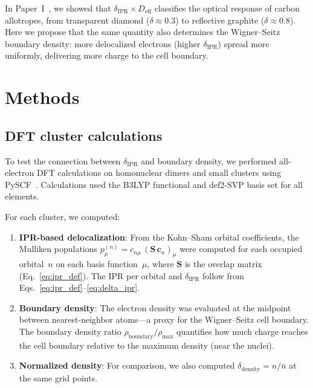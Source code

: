 \documentclass[twocolumn,showpacs,preprintnumbers,amsmath,amssymb,prb]{revtex4-2}
\begin{document}
In Paper~I~\cite{SentoOpticsPaper1}, we showed that
$\delta_\mathrm{IPR} \times D_\mathrm{eff}$ classifies
the optical response of carbon allotropes, from transparent
diamond ($\delta \approx 0.3$) to reflective graphite
($\delta \approx 0.8$).
Here we propose that the same quantity also determines
the Wigner--Seitz boundary density:
more delocalized electrons (higher $\delta_\mathrm{IPR}$)
spread more uniformly, delivering more charge to the
cell boundary.


\section{Methods}
\label{sec:methods}

\subsection{DFT cluster calculations}

To test the connection between $\delta_\mathrm{IPR}$ and
boundary density, we performed all-electron DFT calculations
on homonuclear dimers and small clusters using
PySCF~\cite{PySCF2018}.
Calculations used the B3LYP functional and def2-SVP
basis set for all elements.

For each cluster, we computed:
\begin{enumerate}
  \item \textbf{IPR-based delocalization}:
    From the Kohn--Sham orbital coefficients, the Mulliken
    populations $p_\mu^{(n)} = c_{n\mu}\,(\mathbf{S}\,\mathbf{c}_n)_\mu$
    were computed for each occupied orbital~$n$ on each
    basis function~$\mu$, where $\mathbf{S}$ is the overlap matrix
    (Eq.~\eqref{eq:ipr_def}).
    The IPR per orbital and $\delta_\mathrm{IPR}$ follow from
    Eqs.~\eqref{eq:ipr_def}--\eqref{eq:delta_ipr}.

  \item \textbf{Boundary density}:
    The electron density was evaluated at the midpoint
    between nearest-neighbor atoms---a proxy for the
    Wigner--Seitz cell boundary.
    The boundary density ratio
    $\rho_\mathrm{boundary} / \rho_\mathrm{max}$
    quantifies how much charge reaches the cell boundary
    relative to the maximum density (near the nuclei).

  \item \textbf{Normalized density}:
    For comparison, we also computed
    $\delta_\mathrm{density} = n / \bar{n}$ at the same
    grid points.
\end{enumerate}
\end{document}
